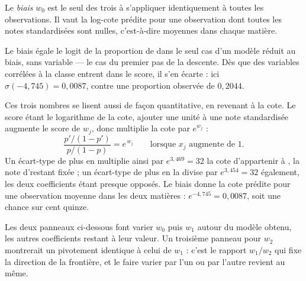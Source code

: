 Le \emph{biais} $w_0$ est le seul des trois à s'appliquer identiquement à toutes
les observations. Il vaut la log-cote prédite pour une observation dont toutes
les notes standardisées sont nulles, c'est-à-dire moyennes dans chaque matière.

Le biais égale le logit de la proportion de \Gryf dans le seul cas d'un modèle
réduit au biais, sans variable --- le cas du premier pas de la descente. Dès que
des variables corrélées à la classe entrent dans
le score, il s'en écarte : ici $\sigma(-4{,}745)=0{,}0087$, contre une proportion
observée de $0{,}2044$.

Ces trois nombres se lisent aussi de façon quantitative, en revenant à la cote.
Le score étant le logarithme de la cote, ajouter une unité à une note
standardisée augmente le score de $w_j$, donc multiplie la cote par $e^{w_j}$ :
\[
  \frac{p'/(1-p')}{p/(1-p)}=e^{\,w_j}
  \qquad\text{lorsque } x_j \text{ augmente de } 1 .
\]
Un écart-type de plus en \Runes multiplie ainsi par $e^{3{,}469}=32$ la cote
d'appartenir à \Gryf, la note d'\Herb restant fixée ; un écart-type de plus en
\Herb la divise par $e^{3{,}454}=32$ également, les deux coefficients étant
presque opposés. Le biais donne la cote prédite pour une observation moyenne dans
les deux matières : $e^{-4{,}745}=0{,}0087$, soit une chance sur cent quinze.

Les deux panneaux ci-dessous font varier $w_0$ puis $w_1$ autour du modèle
obtenu, les autres coefficients restant à leur valeur. Un troisième panneau pour
$w_2$ montrerait un pivotement identique à celui de $w_1$ : c'est le rapport
$w_1/w_2$ qui fixe la direction de la frontière, et le faire varier par l'un ou
par l'autre revient au même.

